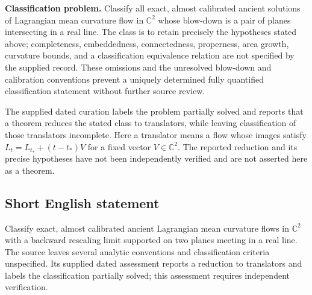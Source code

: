 \documentclass[11pt]{article}
\newcommand{\C}{\mathbb{C}}
\begin{document}
\textbf{Classification problem.} Classify all exact, almost calibrated ancient solutions of Lagrangian mean curvature flow in \(\C^2\) whose blow-down is a pair of planes intersecting in a real line. The class is to retain precisely the hypotheses stated above; completeness, embeddedness, connectedness, properness, area growth, curvature bounds, and a classification equivalence relation are not specified by the supplied record. These omissions and the unresolved blow-down and calibration conventions prevent a uniquely determined fully quantified classification statement without further source review.

The supplied dated curation labels the problem partially solved and reports that a theorem reduces the stated class to translators, while leaving classification of those translators incomplete. Here a translator means a flow whose images satisfy \(L_t=L_{t_*}+(t-t_*)V\) for a fixed vector \(V\in\C^2\). The reported reduction and its precise hypotheses have not been independently verified and are not asserted here as a theorem.
\subsection{Short English statement}
Classify exact, almost calibrated ancient Lagrangian mean curvature flows in \(\C^2\) with a backward rescaling limit supported on two planes meeting in a real line. The source leaves several analytic conventions and classification criteria unspecified. Its supplied dated assessment reports a reduction to translators and labels the classification partially solved; this assessment requires independent verification.
\end{document}
